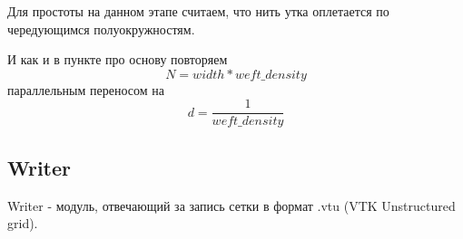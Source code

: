 Для простоты на данном этапе считаем, что нить утка оплетается по чередующимся полуокружностям.

И как и в пункте про основу повторяем
\[
    N = width * weft\_density
\]
параллельным переносом на
\[
    d = \frac{1}{weft\_density}
\]

\subsection*{Writer}
Writer - модуль, отвечающий за запись сетки в формат .vtu (VTK Unstructured grid).

